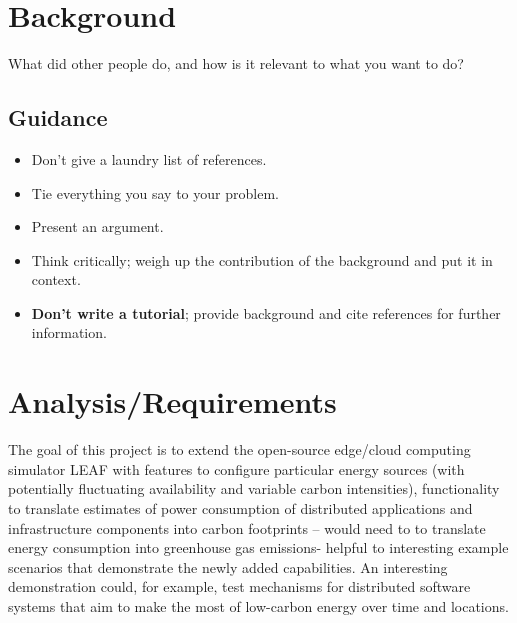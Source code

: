 \documentclass{l4proj}
\begin{document}
%
%
%

\chapter{Background}
What did other people do, and how is it relevant to what you want to do?
\section{Guidance}
\begin{itemize}    
    \item
      Don't give a laundry list of references.
    \item
      Tie everything you say to your problem.
    \item
      Present an argument.
    \item Think critically; weigh up the contribution of the background and put it in context.    
    \item
      \textbf{Don't write a tutorial}; provide background and cite
      references for further information.
\end{itemize}

\chapter{Analysis/Requirements}\label{ch:analysis/requirements}
The goal of this project is to extend the open-source edge/cloud computing simulator LEAF with
features to configure particular energy sources (with potentially fluctuating availability and variable carbon intensities),
functionality to translate estimates of power consumption of distributed applications and infrastructure components into carbon footprints – would need to to translate energy consumption into greenhouse gas emissions- helpful to
interesting example scenarios that demonstrate the newly added capabilities.
An interesting demonstration could, for example, test mechanisms for distributed software systems that aim to make the most of low-carbon energy over time and locations.
\end{document}

